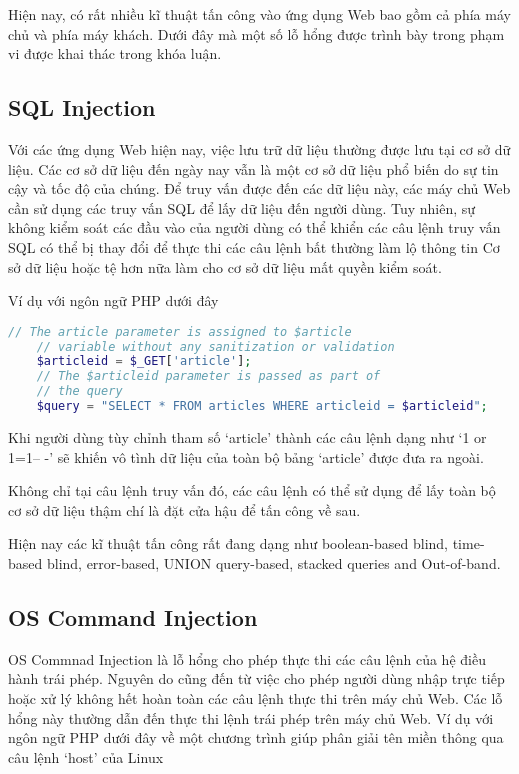 \documentclass[./../main.tex]{subfiles}
\begin{document}
Hiện nay, có rất nhiều kĩ thuật tấn công vào ứng dụng Web bao gồm cả phía
máy chủ và phía máy khách. Dưới đây mà một số lỗ hổng được trình bày trong
phạm vi được khai thác trong khóa luận.

\subsection{SQL Injection}

Với các ứng dụng Web hiện nay, việc lưu trữ dữ liệu thường được lưu tại
cơ sở dữ liệu. Các cơ sở dữ liệu đến ngày nay vẫn là một cơ sở dữ liệu
phổ biến do sự tin cậy và tốc độ của chúng. Để truy vấn được đến các dữ
liệu này, các máy chủ Web cần sử dụng các truy vấn SQL để lấy dữ liệu đến
người dùng. Tuy nhiên, sự không kiểm soát các đầu vào của người dùng có
thể khiển các câu lệnh truy vấn SQL có thể bị thay đổi để thực thi các câu
lệnh bất thường làm lộ thông tin Cơ sở dữ liệu hoặc tệ hơn nữa làm cho cơ
sở dữ liệu mất quyền kiểm soát.

Ví dụ với ngôn ngữ PHP dưới đây
\begin{lstlisting}[language=php, caption=SQL Injection]
    // The article parameter is assigned to $article
    // variable without any sanitization or validation
    $articleid = $_GET['article'];
    // The $articleid parameter is passed as part of
    // the query
    $query = "SELECT * FROM articles WHERE articleid = $articleid";
\end{lstlisting}
Khi người dùng tùy chỉnh tham số `article' thành các câu lệnh dạng như
`1 or 1=1-- -' sẽ khiến vô tình dữ liệu của toàn bộ bảng `article' được
đưa ra ngoài.

Không chỉ tại câu lệnh truy vấn đó, các câu lệnh có thể sử dụng để lấy toàn
bộ cơ sở dữ liệu thậm chí là đặt cửa hậu để tấn công về sau.

Hiện nay các kĩ thuật tấn công rất đang dạng như boolean-based blind,
time-based blind, error-based, UNION query-based, stacked queries and
Out-of-band.

\subsection{OS Command Injection}
OS Commnad Injection là lỗ hổng cho phép thực thi các câu lệnh
của hệ điều hành trái phép. Nguyên do cũng đến từ việc cho phép người dùng
nhập trực tiếp hoặc xử lý không hết hoàn toàn các câu lệnh thực thi trên
máy chủ Web. Các lỗ hổng này thường dẫn đến thực thi lệnh trái phép trên
máy chủ Web.
Ví dụ với ngôn ngữ PHP dưới đây về một chương trình giúp phân giải tên miền
thông qua câu lệnh `host' của Linux
\end{document}
